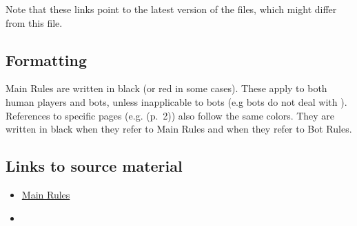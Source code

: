 \documentclass[10pt]{article}
\begin{document}
Note that these links point to the latest version of the files, which might differ from this file.

\subsection*{Formatting}

Main Rules are written in black (or {\color{redTextColor}red} in some cases). These apply to both human players and bots,
unless inapplicable to bots (e.g bots do not deal with \ducats).
References to specific pages (e.g. \dprime(p.~2)\dprime) also follow the same colors.
They are written in black when they refer to Main Rules and 
when they refer to Bot Rules.

\subsection*{Links to source material}

\begin{itemize}
  \item \href{https://boardgamegeek.com/file/download_redirect/0d33a908e03a441022bb49fa1d14cabb51cc63dc03d8e728/Europa_Universalis-Rules-1.2-single_pages.pdf}{Main Rules}
  \item \href{http://cloud-3.steamusercontent.com/ugc/2033983734549955012/5389EBB68D1FB5F9F5E5C9F0268764067BBC79E1/}{}
\end{itemize}


\end{document}
